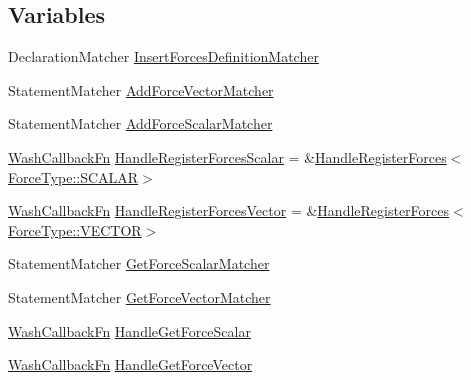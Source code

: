 \subsection*{Variables}
\begin{DoxyCompactItemize}
\item 
Declaration\+Matcher \mbox{\hyperlink{namespacews2st_1_1refactor_1_1forces_ae2be9616466b3c2ef371a455b08dc2bc}{Insert\+Forces\+Definition\+Matcher}}
\item 
Statement\+Matcher \mbox{\hyperlink{namespacews2st_1_1refactor_1_1forces_a7dfd24ab66dba074524ca3dfe669020b}{Add\+Force\+Vector\+Matcher}}
\item 
Statement\+Matcher \mbox{\hyperlink{namespacews2st_1_1refactor_1_1forces_aaedf098bb1dc4e4f48b9b71383366033}{Add\+Force\+Scalar\+Matcher}}
\item 
\mbox{\hyperlink{namespacews2st_a682dfda40d8282c7e579a7b826a7d861}{Wash\+Callback\+Fn}} \mbox{\hyperlink{namespacews2st_1_1refactor_1_1forces_a22d1fdacd9a2da1b94796e4dffd83cd4}{Handle\+Register\+Forces\+Scalar}} = \&\mbox{\hyperlink{namespacews2st_1_1refactor_1_1forces_af8c67c569ff62996a8e4f0d62b29c6a3}{Handle\+Register\+Forces}}$<$\mbox{\hyperlink{namespacews2st_a6f0a66f31a77eae4630693b8d4d27a05a8f3d9a4b6a7b7f2c7afa61ca113d0db9}{Force\+Type\+::\+S\+C\+A\+L\+AR}}$>$
\item 
\mbox{\hyperlink{namespacews2st_a682dfda40d8282c7e579a7b826a7d861}{Wash\+Callback\+Fn}} \mbox{\hyperlink{namespacews2st_1_1refactor_1_1forces_a4f8af8cb0d6a0af0f29e1d887486c612}{Handle\+Register\+Forces\+Vector}} = \&\mbox{\hyperlink{namespacews2st_1_1refactor_1_1forces_af8c67c569ff62996a8e4f0d62b29c6a3}{Handle\+Register\+Forces}}$<$\mbox{\hyperlink{namespacews2st_a6f0a66f31a77eae4630693b8d4d27a05a87752381b583740610f1dfeb07fdad7e}{Force\+Type\+::\+V\+E\+C\+T\+OR}}$>$
\item 
Statement\+Matcher \mbox{\hyperlink{namespacews2st_1_1refactor_1_1forces_a8197f8ce5cb41ce80b4ef4109e5c251e}{Get\+Force\+Scalar\+Matcher}}
\item 
Statement\+Matcher \mbox{\hyperlink{namespacews2st_1_1refactor_1_1forces_a669322efcc73b348dc9111af688a97a3}{Get\+Force\+Vector\+Matcher}}
\item 
\mbox{\hyperlink{namespacews2st_a682dfda40d8282c7e579a7b826a7d861}{Wash\+Callback\+Fn}} \mbox{\hyperlink{namespacews2st_1_1refactor_1_1forces_a1170c01783843b6d549e6a5cd93ec856}{Handle\+Get\+Force\+Scalar}}
\item 
\mbox{\hyperlink{namespacews2st_a682dfda40d8282c7e579a7b826a7d861}{Wash\+Callback\+Fn}} \mbox{\hyperlink{namespacews2st_1_1refactor_1_1forces_ae4344f795df36c8dcff1ac7690147f7d}{Handle\+Get\+Force\+Vector}}

\end{DoxyCompactItemize}
